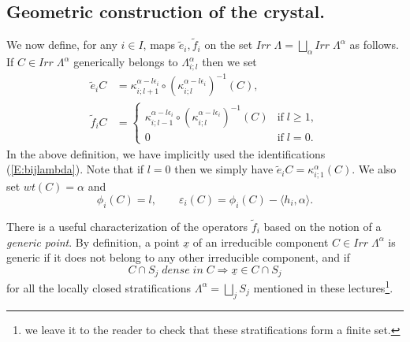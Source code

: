 \documentclass[a4paper,10pt]{amsart}
\def\a{\alpha}
\numberwithin{equation}{section}
\begin{document}
\subsection{Geometric construction of the crystal.}

\vspace{.15in}

We now define, for any $i \in I$,  maps $\tilde{e}_i, \tilde{f}_i$ on the set $Irr\;\Lambda =\bigsqcup_{\a} Irr\;\Lambda^{\a}$ as follows. If $C \in Irr\;\Lambda^{\a}$ generically belongs to $\Lambda^{\a}_{i;l}$ then we set
\begin{equation}\label{E:tildedef}
\begin{split}
\tilde{e}_i C&=\kappa^{\a-l\epsilon_i}_{i;l+1} \circ (\kappa^{\a-l\epsilon_i}_{i;l})^{-1} (C),\\
\tilde{f}_i C&=\begin{cases} \kappa^{\a-l\epsilon_i}_{i;l-1} \circ (\kappa_{i;l}^{\a-l\epsilon_i})^{-1} (C) & \text{if}\;l \geq 1,\\ 0 & \text{if}\;l=0.
\end{cases}
\end{split}
\end{equation}
In the above definition, we have implicitly used the identifications (\ref{E:bijlambda}). Note that if $l=0$ then we simply have $\tilde{e}_iC=\kappa^{\a}_{i;1}(C)$.  We also set $wt(C)=\a$ and
\begin{equation}\label{E:tildedef2}
\phi_i(C)= l, \qquad \varepsilon_i(C)=\phi_i(C)-\langle h_i,\a \rangle.
\end{equation}

\vspace{.1in}

There is a useful characterization of the operators $\tilde{f}_i$ based on the notion of a \textit{generic point}. By definition, a point $\underline{x}$ of an irreducible component $C \in Irr\;\Lambda^{\a}$ is generic if it does not belong to any other irreducible component, and if 
$$C \cap S_j \;dense\;in\;C \Rightarrow \underline{x} \in C \cap S_j$$
for all the locally closed stratifications $\Lambda^{\a}=\bigsqcup_j S_j$ mentioned in these lectures\footnote{we leave it to the reader to check that these stratifications form a finite set.}.

\vspace{.1in}
\end{document}
